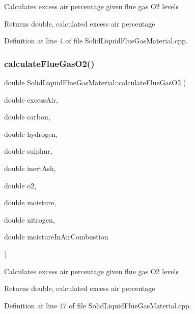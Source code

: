 Calculates excess air percentage given flue gas O2 levels \begin{DoxyReturn}{Returns}
double, calculated excess air percentage 
\end{DoxyReturn}


Definition at line 4 of file Solid\+Liquid\+Flue\+Gas\+Material.\+cpp.

\mbox{\label{class_solid_liquid_flue_gas_material_a39dbc6f412ce2ec739ed8107fbdc68a7}} 
\subsubsection{\texorpdfstring{calculate\+Flue\+Gas\+O2()}{calculateFlueGasO2()}}
{\footnotesize\ttfamily double Solid\+Liquid\+Flue\+Gas\+Material\+::calculate\+Flue\+Gas\+O2 (\begin{DoxyParamCaption}\item[{double}]{excess\+Air,  }\item[{double}]{carbon,  }\item[{double}]{hydrogen,  }\item[{double}]{sulphur,  }\item[{double}]{inert\+Ash,  }\item[{double}]{o2,  }\item[{double}]{moisture,  }\item[{double}]{nitrogen,  }\item[{double}]{moisture\+In\+Air\+Combustion }\end{DoxyParamCaption})\hspace{0.3cm}{\ttfamily [static]}}

Calculates excess air percentage given flue gas O2 levels \begin{DoxyReturn}{Returns}
double, calculated excess air percentage 
\end{DoxyReturn}


Definition at line 47 of file Solid\+Liquid\+Flue\+Gas\+Material.\+cpp.

\mbox{\label{class_solid_liquid_flue_gas_material_ab233d4e27397cc74fbe2d3084e4e6f7c}} 
